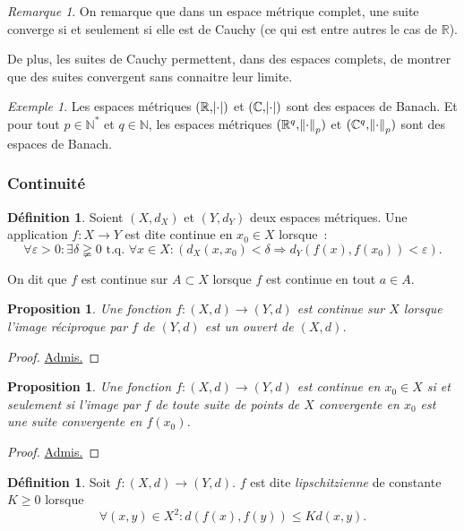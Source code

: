 \documentclass{report}
\newtheorem{prp}[thm]{Proposition}
\theoremstyle{definition}
\newtheorem{déf}[thm]{Définition}
\theoremstyle{remark}
\newtheorem*{rmq}{Remarque}
\newtheorem{ex}{Exemple}[chapter]
\numberwithin{equation}{section}
\newcommand{\C}{\mathbb C}
\newcommand{\R}{\mathbb R}
\newcommand{\N}{\mathbb N}
\newcommand{\Ns}{\N^{*}}
\newcommand{\tq}{\text{ t.q. }}
\newcommand{\grantedproof}{\begin{proof} \underline{Admis.} \end{proof}}
\begin{document}
				\begin{rmq} On remarque que dans un espace métrique complet, une suite converge si et seulement si elle est de Cauchy
				(ce qui est entre autres le cas de $\R$).

				De plus, les suites de Cauchy permettent, dans des espaces complets, de montrer que des suites convergent sans connaitre leur limite. \end{rmq}

				\begin{ex} Les espaces métriques $(\R, \abs \cdot)$ et $(\C, \abs \cdot)$ sont des espaces de Banach. Et pour tout $p \in \Ns$ et
				$q \in \N$, les espaces métriques $(\R^q, \norm \cdot_p)$ et $(\C^q, \norm \cdot_p)$ sont des espaces de Banach. \end{ex}

			\subsubsection{Continuité}
				\begin{déf} Soient $(X, d_X)$ et $(Y, d_Y)$ deux espaces métriques. Une application $f : X \to Y$ est dite continue en $x_0 \in X$ lorsque~:
				\begin{equation}
					\forall \varepsilon > 0 : \exists \delta \gneqq 0 \tq \forall x \in X :
					\left(d_X(x, x_0) < \delta \Rightarrow d_Y(f(x), f(x_0)) < \varepsilon\right).
				\end{equation}

				On dit que $f$ est continue sur $A \subset X$ lorsque $f$ est continue en tout $a \in A$.
				\end{déf}

				\begin{prp} Une fonction $f : (X, d) \to (Y, d)$ est continue sur $X$ lorsque l'image réciproque par $f$ de $(Y, d)$ est un ouvert de $(X, d)$.
				\end{prp}

				\grantedproof

				\begin{prp} Une fonction $f : (X, d) \to (Y, d)$ est continue en $x_0 \in X$ si et seulement si l'image par $f$ de toute suite de points de
				$X$ convergente en $x_0$ est une suite convergente en $f(x_0)$. \end{prp}

				\grantedproof

				\begin{déf} Soit $f : (X, d) \to (Y, d)$. $f$ est dite \textit{lipschitzienne} de constante $K \geq 0$ lorsque~
				\begin{equation}
					\forall (x, y) \in X^2 : d(f(x), f(y)) \leq Kd(x, y).
				\end{equation}
				\end{déf}
\end{document}
